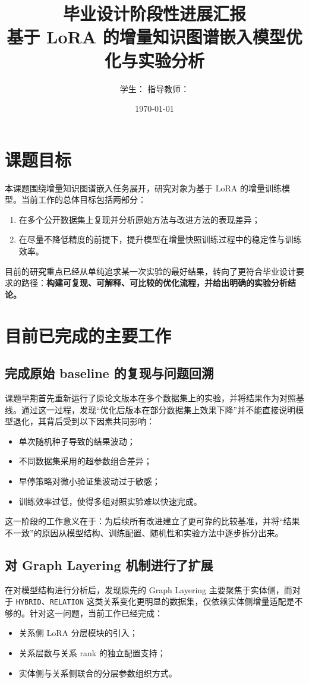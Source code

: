 \documentclass[12pt,a4paper]{ctexart}
\title{\textbf{毕业设计阶段性进展汇报}\\[4pt]
\large 基于 LoRA 的增量知识图谱嵌入模型优化与实验分析}
\author{学生：\underline{\hspace{3cm}} \qquad 指导教师：\underline{\hspace{3cm}}}
\date{\today}
\begin{document}
\maketitle

\section{课题目标}
本课题围绕增量知识图谱嵌入任务展开，研究对象为基于 LoRA 的增量训练模型。当前工作的总体目标包括两部分：
\begin{enumerate}
  \item 在多个公开数据集上复现并分析原始方法与改进方法的表现差异；
  \item 在尽量不降低精度的前提下，提升模型在增量快照训练过程中的稳定性与训练效率。
\end{enumerate}

目前的研究重点已经从单纯追求某一次实验的最好结果，转向了更符合毕业设计要求的路径：\textbf{构建可复现、可解释、可比较的优化流程，并给出明确的实验分析结论。}

\section{目前已完成的主要工作}

\subsection{完成原始 baseline 的复现与问题回溯}
课题早期首先重新运行了原论文版本在多个数据集上的实验，并将结果作为对照基线。通过这一过程，发现“优化后版本在部分数据集上效果下降”并不能直接说明模型退化，其背后受到以下因素共同影响：
\begin{itemize}
  \item 单次随机种子导致的结果波动；
  \item 不同数据集采用的超参数组合差异；
  \item 早停策略对微小验证集波动过于敏感；
  \item 训练效率过低，使得多组对照实验难以快速完成。
\end{itemize}

这一阶段的工作意义在于：为后续所有改进建立了更可靠的比较基准，并将“结果不一致”的原因从模型结构、训练配置、随机性和实验方法中逐步拆分出来。

\subsection{对 Graph Layering 机制进行了扩展}
在对模型结构进行分析后，发现原先的 Graph Layering 主要聚焦于实体侧，而对于 \texttt{HYBRID}、\texttt{RELATION} 这类关系变化更明显的数据集，仅依赖实体侧增量适配是不够的。针对这一问题，当前工作已经完成：
\begin{itemize}
  \item 关系侧 LoRA 分层模块的引入；
  \item 关系层数与关系 rank 的独立配置支持；
  \item 实体侧与关系侧联合的分层参数组织方式。
\end{itemize}
\end{document}
